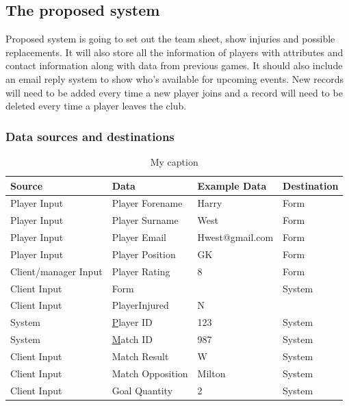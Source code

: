 \subsection{The proposed system}
Proposed system is going to set out the team sheet, show injuries and possible replacements. It will also store all the information of players with attributes and contact information along with data from previous games. It should also include an email reply system to show who's available for upcoming events. New records will need to be added every time a new player joins and a record will need to be deleted every time a player leaves the club.

\subsubsection{Data sources and destinations}
\begin{table}[]
\centering
\caption{My caption}
\label{my-label}
\begin{tabular}{|l|l|l|l|}
\hline
Source               & Data             & Example Data    & Destination \\ \hline
Player Input         & Player Forename  & Harry           & Form        \\ \hline
Player Input         & Player Surname   & West            & Form        \\ \hline
Player Input         & Player Email     & Hwest@gmail.com & Form        \\ \hline
Player Input         & Player Position  & GK              & Form        \\ \hline
Client/manager Input & Player Rating    & 8               & Form        \\ \hline
Client Input         & Form             &                 & System      \\ \hline
Client Input         & PlayerInjured    & N               &             \\ \hline
System               & {\ul Player ID}  & 123             & System      \\ \hline
System               & {\ul Match ID}   & 987             & System      \\ \hline
Client Input         & Match Result     & W               & System      \\ \hline
Client Input         & Match Opposition & Milton          & System      \\ \hline
Client Input         & Goal Quantity    & 2               & System      \\ \hline
\end{tabular}
\end{table}

